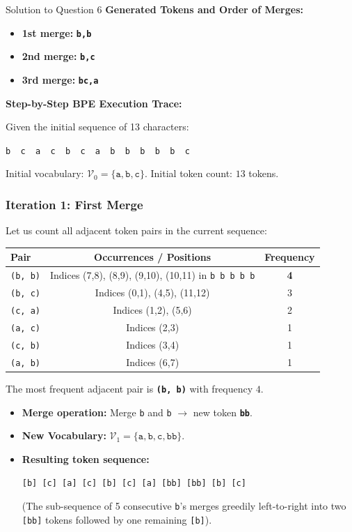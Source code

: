 \documentclass[11pt,a4paper]{article}
\begin{document}
\bigskip

\begin{solutionbox}{Solution to Question 6}
\textbf{Generated Tokens and Order of Merges:}
\begin{itemize}
    \item \textbf{1st merge:} \texttt{\textbf{b,b}}
    \item \textbf{2nd merge:} \texttt{\textbf{b,c}}
    \item \textbf{3rd merge:} \texttt{\textbf{bc,a}}
\end{itemize}

\medskip
\textbf{Step-by-Step BPE Execution Trace:}

Given the initial sequence of 13 characters:
\begin{center}
\texttt{b \ c \ a \ c \ b \ c \ a \ b \ b \ b \ b \ b \ c}
\end{center}
Initial vocabulary: $\mathcal{V}_0 = \{\texttt{a}, \texttt{b}, \texttt{c}\}$.
Initial token count: $13$ tokens.

\subsubsection*{Iteration 1: First Merge}
Let us count all adjacent token pairs in the current sequence:
\begin{center}
\begin{tabular}{lcc}
\toprule
\textbf{Pair} & \textbf{Occurrences / Positions} & \textbf{Frequency} \\
\midrule
\texttt{(b, b)} & Indices (7,8), (8,9), (9,10), (10,11) in \texttt{b b b b b} & \textbf{4} \\
\texttt{(b, c)} & Indices (0,1), (4,5), (11,12) & 3 \\
\texttt{(c, a)} & Indices (1,2), (5,6) & 2 \\
\texttt{(a, c)} & Indices (2,3) & 1 \\
\texttt{(c, b)} & Indices (3,4) & 1 \\
\texttt{(a, b)} & Indices (6,7) & 1 \\
\bottomrule
\end{tabular}
\end{center}
The most frequent adjacent pair is \texttt{\textbf{(b, b)}} with frequency $4$.
\begin{itemize}
    \item \textbf{Merge operation:} Merge \texttt{b} and \texttt{b} $\longrightarrow$ new token \texttt{\textbf{bb}}.
    \item \textbf{New Vocabulary:} $\mathcal{V}_1 = \{\texttt{a}, \texttt{b}, \texttt{c}, \texttt{bb}\}$.
    \item \textbf{Resulting token sequence:}
    \begin{center}
    \texttt{[b] [c] [a] [c] [b] [c] [a] [bb] [bb] [b] [c]}
    \end{center}
    (The sub-sequence of 5 consecutive \texttt{b}'s merges greedily left-to-right into two \texttt{[bb]} tokens followed by one remaining \texttt{[b]}).
\end{itemize}


\end{solutionbox}
\end{document}
